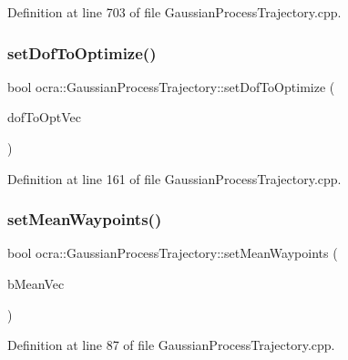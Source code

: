 Definition at line 703 of file Gaussian\+Process\+Trajectory.\+cpp.

\hypertarget{classocra_1_1GaussianProcessTrajectory_ade78792c6b17174f77c0e0c60d4d4755}{}\label{classocra_1_1GaussianProcessTrajectory_ade78792c6b17174f77c0e0c60d4d4755} 
\subsubsection{\texorpdfstring{set\+Dof\+To\+Optimize()}{setDofToOptimize()}}
{\footnotesize\ttfamily bool ocra\+::\+Gaussian\+Process\+Trajectory\+::set\+Dof\+To\+Optimize (\begin{DoxyParamCaption}\item[{std\+::vector$<$ Eigen\+::\+Vector\+Xi $>$ \&}]{dof\+To\+Opt\+Vec }\end{DoxyParamCaption})}



Definition at line 161 of file Gaussian\+Process\+Trajectory.\+cpp.

\hypertarget{classocra_1_1GaussianProcessTrajectory_abdafe69c3db6d514bbe8ae5f560cf466}{}\label{classocra_1_1GaussianProcessTrajectory_abdafe69c3db6d514bbe8ae5f560cf466} 
\subsubsection{\texorpdfstring{set\+Mean\+Waypoints()}{setMeanWaypoints()}}
{\footnotesize\ttfamily bool ocra\+::\+Gaussian\+Process\+Trajectory\+::set\+Mean\+Waypoints (\begin{DoxyParamCaption}\item[{\hyperlink{namespaceocra_afaf4559cfedb560f8d1fe9bf6a21678f}{bool\+Vector} \&}]{b\+Mean\+Vec }\end{DoxyParamCaption})}



Definition at line 87 of file Gaussian\+Process\+Trajectory.\+cpp.

\hypertarget{classocra_1_1GaussianProcessTrajectory_a422e7c21958eded0e101ea9a0198e2f6}{}\label{classocra_1_1GaussianProcessTrajectory_a422e7c21958eded0e101ea9a0198e2f6} 
